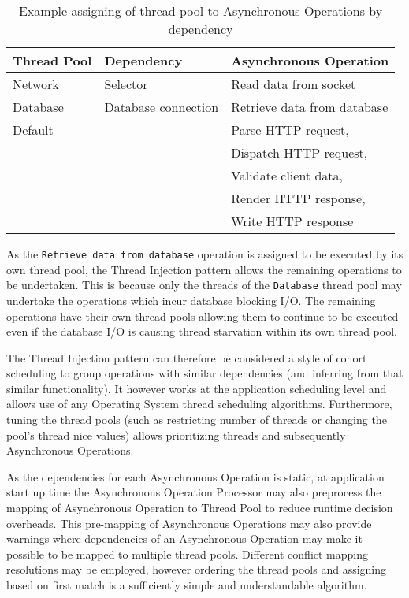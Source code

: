 \documentclass{article}
\begin{document}
\begin{table}[!t]
\renewcommand{\arraystretch}{1.3}
\caption{Example assigning of thread pool to Asynchronous Operations by dependency}
\label{tab:example_request_thread_pools}
\centering
\begin{tabular}{l||l||l}
\hline
\bfseries Thread Pool & \bfseries Dependency & \bfseries Asynchronous Operation \\
\hline\hline
Network & Selector & Read data from socket \\
\hline
Database & Database connection & Retrieve data from database \\
\hline
Default & - & Parse HTTP request, \\
& & Dispatch HTTP request, \\
& & Validate client data, \\ 
& & Render HTTP response, \\
& & Write HTTP response \\
\hline
\end{tabular}
\end{table}

As the \texttt{Retrieve data from database} operation is assigned to be executed
by its own thread pool, the Thread Injection pattern allows the remaining
operations to be undertaken.  This is because only the threads of the
\texttt{Database} thread pool may undertake the operations which incur database
blocking I/O.  The remaining operations have their own thread pools allowing
them to continue to be executed even if the database I/O is causing thread
starvation within its own thread pool.

The Thread Injection pattern can therefore be considered a style of cohort
scheduling \cite{cohort} to group operations with similar dependencies (and
inferring from that similar functionality).  It however works at the application
scheduling level and allows use of any Operating System thread scheduling
algorithms.  Furthermore, tuning the thread pools (such as restricting number of
threads or changing the pool's thread nice values) allows prioritizing threads and
subsequently Asynchronous Operations.

As the dependencies for each Asynchronous Operation is static, at application
start up time the Asynchronous Operation Processor may also preprocess the
mapping of Asynchronous Operation to Thread Pool to reduce runtime decision
overheads.  This pre-mapping of Asynchronous Operations may also provide
warnings where dependencies of an Asynchronous Operation may make it possible to
be mapped to multiple thread pools.  Different conflict mapping resolutions may
be employed, however ordering the thread pools and assigning based on first
match is a sufficiently simple and understandable algorithm.
\end{document}
